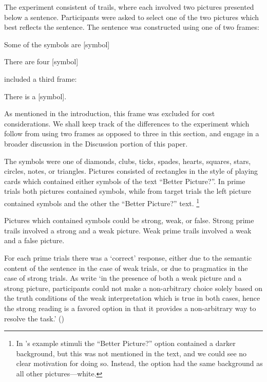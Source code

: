 \documentclass[10pt]{article}
\begin{document}
\begin{multicols}{2}
The experiment consistent of trails, where each involved two pictures presented below a sentence.
Participants were asked to select one of the two pictures which best reflects the sentence.
The sentence was constructed using one of two frames:
\begin{enumerate*}[label=(\roman*)]
\item Some of the symbols are [symbol]
\item There are four [symbol]
\end{enumerate*}
\citeauthor{Bott:2016aa} included a third frame:
\begin{enumerate*}[label=(\roman*), resume]
\item There is a [symbol].
\end{enumerate*}
As mentioned in the introduction, this frame was excluded for cost considerations.
We shall keep track of the differences to the experiment which follow from using two frames as opposed to three in this section, and engage in a broader discussion in the Discussion portion of this paper.

The symbols were one of diamonds, clubs, ticks, spades, hearts, squares, stars, circles, notes, or triangles.
Pictures consisted of rectangles in the style of playing cards which contained either symbols of the text ``Better Picture?''.
In prime trials both pictures contained symbols, while from target trials the left picture contained symbols and the other the ``Better Picture?'' text.\nolinebreak
\footnote{In \citeauthor{Bott:2016aa}'s example stimuli the ``Better Picture?'' option contained a darker background, but this was not mentioned in the text, and we could see no clear motivation for doing so.
Instead, the option had the same background as all other pictures---white.}

Pictures which contained symbols could be strong, weak, or false.
Strong prime trails involved a strong and a weak picture.
Weak prime trails involved a weak and a false picture.

For each prime trials there was a `correct' response, either due to the semantic content of the sentence in the case of weak trials, or due to pragmatics in the case of strong trials.
As \citeauthor{Bott:2016aa} write `in the presence of both a weak picture and a strong picture, participants could not make a non-arbitrary choice solely based on the truth conditions of the weak interpretation which is true in both cases, hence the strong reading is a favored option in that it provides a non-arbitrary way to resolve the task.'
(\citeyear[124]{Bott:2016aa})


\end{multicols}
\end{document}
